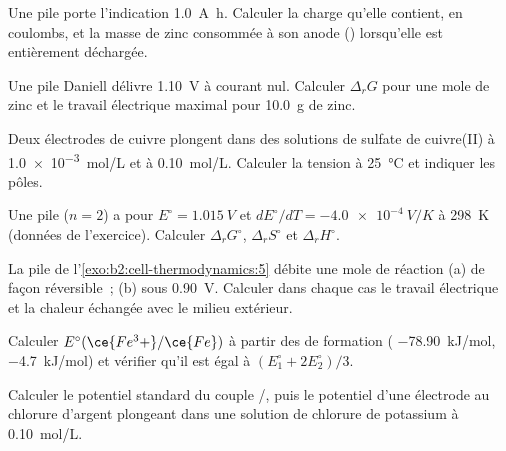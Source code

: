 \begin{exercise}[$\star$]\label{exo:b2:cell-thermodynamics:2}
Une pile porte l'indication \qty{1.0}{A.h}. Calculer la charge qu'elle contient, en coulombs,
et la masse de zinc consommée à son anode () lorsqu'elle est
entièrement déchargée.
\end{exercise}

\begin{exercise}[$\star$]\label{exo:b2:cell-thermodynamics:3}
Une pile Daniell délivre \qty{1.10}{V} à courant nul. Calculer $\Delta_r G$ pour une
mole de zinc et le travail électrique maximal pour \qty{10.0}{g} de zinc.
\end{exercise}

\begin{exercise}[$\star$]\label{exo:b2:cell-thermodynamics:4}
Deux électrodes de cuivre plongent dans des solutions de sulfate de cuivre(II) à \qty{1.0e-3}{mol/L}
et à \qty{0.10}{mol/L}. Calculer la tension à \qty{25}{\degreeCelsius} et indiquer les
pôles.
\end{exercise}

\begin{exercise}[$\star\star$]\label{exo:b2:cell-thermodynamics:5}
Une pile ($n = 2$) a pour $E^\circ = \qty{1.015}{V}$ et $dE^\circ/dT = \qty{-4.0e-4}{V/K}$
à \qty{298}{K} (données de l'exercice). Calculer $\Delta_r G^\circ$, $\Delta_r S^\circ$ et
$\Delta_r H^\circ$.
\end{exercise}

\begin{exercise}[$\star\star$]\label{exo:b2:cell-thermodynamics:6}
La pile de l'\cref{exo:b2:cell-thermodynamics:5} débite une mole de réaction
(a) de façon réversible~; (b) sous \qty{0.90}{V}. Calculer dans chaque cas le travail électrique et
la chaleur échangée avec le milieu extérieur.
\end{exercise}

\begin{exercise}[$\star\star$]\label{exo:b2:cell-thermodynamics:7}
Calculer $E^\circ(\ce{Fe^3+}/\ce{Fe})$ à partir des  de formation
( \qty{-78.90}{kJ/mol},  \qty{-4.7}{kJ/mol}) et vérifier qu'il
est égal à $(E_1^\circ + 2E_2^\circ)/3$.
\end{exercise}

\begin{exercise}[$\star\star$]\label{exo:b2:cell-thermodynamics:8}
Calculer le potentiel standard du couple /, puis le
potentiel d'une électrode au chlorure d'argent plongeant dans une solution de chlorure de potassium
à \qty{0.10}{mol/L}.
\end{exercise}

